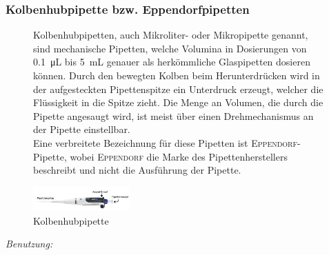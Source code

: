 \subsubsection*{Kolbenhubpipette bzw. Eppendorfpipetten}
\begin{figure}[h!]
	\begin{minipage}[t]{0.63\textwidth}
		\vspace{0pt}
		Kolbenhubpipetten, auch Mikroliter- oder Mikropipette genannt, sind mechanische Pipetten, welche Volumina in Dosierungen von \SI{0,1}{\micro \liter} bis \SI{5}{\milli \liter}  genauer als herkömmliche Glaspipetten dosieren können. Durch den bewegten Kolben beim Herunterdrücken wird in der aufgesteckten Pipettenspitze ein Unterdruck erzeugt, welcher die Flüssigkeit in die Spitze zieht. Die Menge an Volumen, die durch die Pipette angesaugt wird, ist meist über einen Drehmechanismus an der Pipette einstellbar.\\
		Eine verbreitete Bezeichnung für diese Pipetten ist \mbox{\textsc{Eppendorf}}-Pipette, wobei \textsc{Eppendorf} die Marke des Pipettenherstellers beschreibt und nicht die Ausführung der Pipette.
	\end{minipage}
	\hfill
	\begin{minipage}[t]{0.35\textwidth}
		\vspace{0pt}
		\centering
		\includegraphics[angle=90, width=0.33\textwidth]{img/eppendorf}
		\caption{Kolbenhubpipette}
		\label{fig:eppen}
	\end{minipage}
\end{figure}
\FloatBarrier

\textit{Benutzung:}\\
\vspace*{-5mm}



